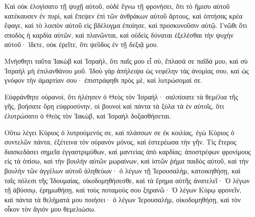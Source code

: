 {Καὶ οὐκ ἐλογίσατο τῇ ψυχῇ αὐτοῦ, οὐδὲ ἔγνω τῇ φρονήσει, ὅτι τὸ ἥμισυ αὐτοῦ κατέκαυσεν ἐν πυρὶ, καὶ ἔπεψεν ἐπὶ τῶν ἀνθράκων αὐτοῦ ἄρτους, καὶ ὀπτήσας κρέα ἔφαγε, καὶ τὸ λοιπὸν αὐτοῦ εἰς βδέλυγμα ἐποίησε, καὶ προσκυνοῦσιν αὐτῷ.
Γνῶθι ὅτι σποδὸς ἡ καρδία αὐτῶν, καὶ πλανῶνται, καὶ οὐδεὶς δύναται ἐξελέσθαι τὴν ψυχὴν αὐτοῦ· ἴδετε, οὐκ ἐρεῖτε, ὅτι ψεῦδος ἐν τῇ δεξιᾷ μου.
\par }{\PP {}Μνήσθητι ταῦτα Ἰακὼβ καὶ Ἰσραὴλ, ὅτι παῖς μου εἶ σὺ, ἔπλασά σε παῖδά μου, καὶ σὺ Ἰσραὴλ μὴ ἐπιλανθάνου μοῦ.
Ἰδοὺ γὰρ ἀπήλειψα ὡς νεφέλην τὰς ἀνομίας σου, καὶ ὡς γνόφον τὴν ἁμαρτίαν σου· ἐπιστράφηθι πρὸς μὲ, καὶ λυτρώσομαί σε.
\par }{\PP {}Εὐφράνθητε οὐρανοὶ, ὅτι ἠλέησεν ὁ Θεὸς τὸν Ἰσραήλ· σαλπίσατε τὰ θεμέλια τῆς γῆς, βοήσατε ὄρη εὐφροσύνην, οἱ βουνοὶ καὶ πάντα τὰ ξύλα τὰ ἐν αὐτοῖς, ὅτι ἐλυτρώσατο ὁ Θεὸς τὸν Ἰακὼβ, καὶ Ἰσραὴλ δοξασθήσεται.
\par }{\PP {}Οὕτω λέγει Κύριος ὁ λυτρούμενός σε, καὶ πλάσσων σε ἐκ κοιλίας, ἐγὼ Κύριος ὁ συντελῶν πάντα, ἐξέτεινα τὸν οὐρανὸν μόνος, καὶ ἐστερέωσα τὴν γῆν.
Τίς ἕτερος διασκεδάσει σημεῖα ἐγγαστριμύθων, καὶ μαντείας ἀπὸ καρδίας; ἀποστρέφων φρονίμους εἰς τὰ ὀπίσω, καὶ τὴν βουλὴν αὐτῶν μωραίνων,
καὶ ἱστῶν ῥήμα παιδὸς αὐτοῦ, καὶ τὴν βουλὴν τῶν ἀγγέλων αὐτοῦ ἀληθεύων· ὁ λέγων τῇ Ἱερουσαλὴμ, κατοικηθήσῃ, καὶ ταῖς πόλεσι τῆς Ἰδουμαίας, οἰκοδομηθήσεσθε, καὶ τὰ ἔρημα αὐτῆς ἀνατελεῖ·
Ὁ λέγων τῇ ἀβύσσῳ, ἐρημωθήσῃ, καὶ τοὺς ποταμούς σου ξηρανῶ·
Ὁ λέγων Κύρῳ φρονεῖν, καὶ πάντα τὰ θελήματά μου ποιήσει· ὁ λέγων Ἱερουσαλὴμ, οἰκοδομηθήσῃ, καὶ τὸν οἶκον τὸν ἅγιόν μου θεμελιώσω.

}
